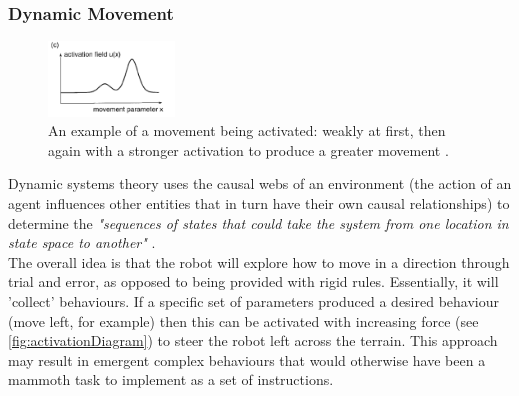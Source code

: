 \documentclass{article}
\begin{document}
\subsubsection{Dynamic Movement}
\label{sec:DST Aims}
\begin{figure}
    \centering
    \vspace*{-5mm}
    \includegraphics[width=0.3\textwidth]{activationExample}
    \caption{An example of a movement being activated: weakly at first, then again with a stronger activation to produce a greater movement \citep{dft}.}
    \label{fig:activationDiagram}
\end{figure}
Dynamic systems theory uses the causal webs of an environment (the action of an agent influences other entities that in turn have their own causal relationships) to determine the \textit{"sequences of states that could take the system from one location in state space to another"} .\\
The overall idea is that the robot will explore how to move in a direction through trial and error, as opposed to being provided with rigid rules. Essentially, it will 'collect' behaviours. If a specific set of parameters produced a desired behaviour (move left, for example) then this can be activated with increasing force (see \autoref{fig:activationDiagram}) to steer the robot left across the terrain. This approach may result in emergent complex behaviours that would otherwise have been a mammoth task to implement as a set of instructions. \\
\end{document}
